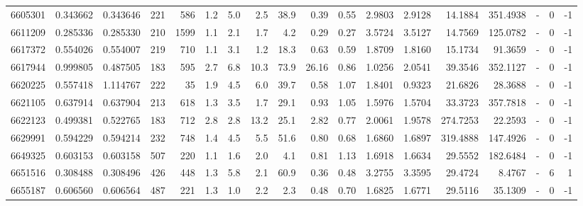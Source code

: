 \begin{tabular}{rrrrrrrrrrrrrrrlrr}
   6605301 & 0.343662 &   0.343646 &  221 &  586 &      1.2 &      5.0 &     2.5 &     38.9 &       0.39 &        0.55 &  2.9803 &  2.9128 &   14.1884 &  351.4938 &             - &        0 &         -1 \\
   6611209 & 0.285336 &   0.285330 &  210 & 1599 &      1.1 &      2.1 &     1.7 &      4.2 &       0.29 &        0.27 &  3.5724 &  3.5127 &   14.7569 &  125.0782 &             - &        0 &         -1 \\
   6617372 & 0.554026 &   0.554007 &  219 &  710 &      1.1 &      3.1 &     1.2 &     18.3 &       0.63 &        0.59 &  1.8709 &  1.8160 &   15.1734 &   91.3659 &             - &        0 &         -1 \\
   6617944 & 0.999805 &   0.487505 &  183 &  595 &      2.7 &      6.8 &    10.3 &     73.9 &      26.16 &        0.86 &  1.0256 &  2.0541 &   39.3546 &  352.1127 &             - &        0 &         -1 \\
   6620225 & 0.557418 &   1.114767 &  222 &   35 &      1.9 &      4.5 &     6.0 &     39.7 &       0.58 &        1.07 &  1.8401 &  0.9323 &   21.6826 &   28.3688 &             - &        0 &         -1 \\
   6621105 & 0.637914 &   0.637904 &  213 &  618 &      1.3 &      3.5 &     1.7 &     29.1 &       0.93 &        1.05 &  1.5976 &  1.5704 &   33.3723 &  357.7818 &             - &        0 &         -1 \\
   6622123 & 0.499381 &   0.522765 &  183 &  712 &      2.8 &      2.8 &    13.2 &     25.1 &       2.82 &        0.77 &  2.0061 &  1.9578 &  274.7253 &   22.2593 &             - &        0 &         -1 \\
   6629991 & 0.594229 &   0.594214 &  232 &  748 &      1.4 &      4.5 &     5.5 &     51.6 &       0.80 &        0.68 &  1.6860 &  1.6897 &  319.4888 &  147.4926 &             - &        0 &         -1 \\
   6649325 & 0.603153 &   0.603158 &  507 &  220 &      1.1 &      1.6 &     2.0 &      4.1 &       0.81 &        1.13 &  1.6918 &  1.6634 &   29.5552 &  182.6484 &             - &        0 &         -1 \\
   6651516 & 0.308488 &   0.308496 &  426 &  448 &      1.3 &      5.8 &     2.1 &     60.9 &       0.36 &        0.48 &  3.2755 &  3.3595 &   29.4724 &    8.4767 &             - &        6 &          1 \\
   6655187 & 0.606560 &   0.606564 &  487 &  221 &      1.3 &      1.0 &     2.2 &      2.3 &       0.48 &        0.70 &  1.6825 &  1.6771 &   29.5116 &   35.1309 &             - &        0 &         -1 \\

\end{tabular}
